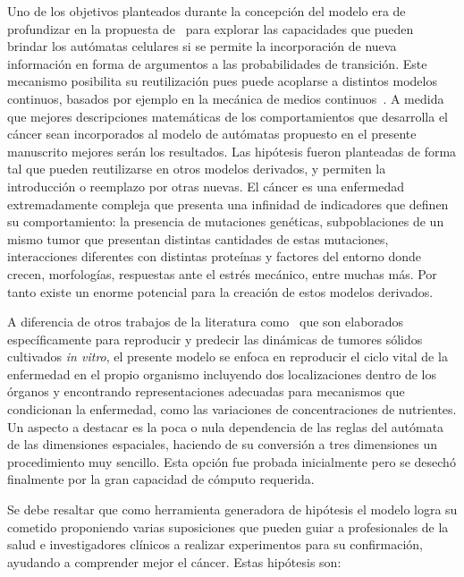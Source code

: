 Uno de los objetivos planteados durante la concepci\'on del modelo era de profundizar en la propuesta de~\cite{guinot} para explorar las capacidades que pueden brindar los aut\'omatas celulares si se permite la incorporaci\'on de nueva informaci\'on en forma de argumentos a las probabilidades de transici\'on. Este mecanismo posibilita su reutilizaci\'on pues puede acoplarse a distintos modelos continuos, basados por ejemplo en la mec\'anica de medios continuos~\cite{ruben}. A medida que mejores descripciones matem\'aticas de los comportamientos que desarrolla el c\'ancer sean incorporados al modelo de aut\'omatas propuesto en el presente manuscrito mejores ser\'an los resultados. Las hip\'otesis fueron planteadas de forma tal que pueden reutilizarse en otros modelos derivados, y permiten la introducci\'on o reemplazo por otras nuevas. El c\'ancer es una enfermedad extremadamente compleja que presenta una infinidad de indicadores que definen su comportamiento: la presencia de mutaciones gen\'eticas, subpoblaciones de un mismo tumor que presentan distintas cantidades de estas mutaciones, interacciones diferentes con distintas prote\'inas y factores del entorno donde crecen, morfolog\'ias, respuestas ante el estr\'es mec\'anico, entre muchas m\'as. Por tanto existe un enorme potencial para la creaci\'on de estos modelos derivados.

A diferencia de otros trabajos de la literatura como~\cite{kansal,kansal3} que son elaborados espec\'ificamente para reproducir y predecir las din\'amicas de tumores s\'olidos cultivados \emph{in vitro}, el presente modelo se enfoca en reproducir el ciclo vital de la enfermedad en el propio organismo incluyendo dos localizaciones dentro de los \'organos y encontrando representaciones adecuadas para mecanismos que condicionan la enfermedad, como las variaciones de concentraciones de nutrientes. Un aspecto a destacar es la poca o nula dependencia de las reglas del aut\'omata de las dimensiones espaciales, haciendo de su conversi\'on a tres dimensiones un procedimiento muy sencillo. Esta opci\'on fue probada inicialmente pero se desech\'o finalmente por la gran capacidad de c\'omputo requerida. 

Se debe resaltar que como herramienta generadora de hip\'otesis el modelo logra su cometido proponiendo varias suposiciones que pueden guiar a profesionales de la salud e investigadores cl\'inicos a realizar experimentos para su confirmaci\'on, ayudando a comprender mejor el c\'ancer. Estas hip\'otesis son:

